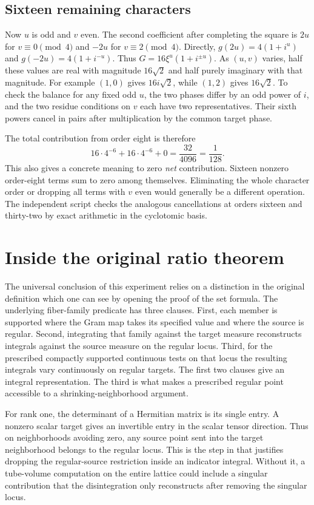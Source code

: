 \documentclass[12pt,letterpaper]{article}
\newcommand{\code}[1]{\texttt{\detokenize{#1}}}
\begin{document}
\subsection{Sixteen remaining characters}
Now $u$ is odd and $v$ even. The second coefficient after completing the square is $2u$ for $v\equiv0\pmod4$ and $-2u$ for $v\equiv2\pmod4$. Directly, $g(2u)=4(1+i^u)$ and $g(-2u)=4(1+i^{-u})$. Thus $G=16\xi^u(1+i^{\pm u})$. As $(u,v)$ varies, half these values are real with magnitude $16\sqrt2$ and half purely imaginary with that magnitude. For example $(1,0)$ gives $16i\sqrt2$, while $(1,2)$ gives $16\sqrt2$. To check the balance for any fixed odd $u$, the two phases differ by an odd power of $i$, and the two residue conditions on $v$ each have two representatives. Their sixth powers cancel in pairs after multiplication by the common target phase.
\par
The total contribution from order eight is therefore
\[
        16\cdot4^{-6}+16\cdot4^{-6}+0=\frac{32}{4096}=\frac1{128}.
\]
This also gives a concrete meaning to zero \emph{net} contribution. Sixteen nonzero order-eight terms sum to zero among themselves. Eliminating the whole character order or dropping all terms with $v$ even would generally be a different operation. The independent script checks the analogous cancellations at orders sixteen and thirty-two by exact arithmetic in the cyclotomic basis.
\section{Inside the original ratio theorem}
The universal conclusion of this experiment relies on a distinction in the original definition which one can see by opening the proof of the set formula. The underlying fiber-family predicate has three clauses. First, each member is supported where the Gram map takes its specified value and where the source is regular. Second, integrating that family against the target measure reconstructs integrals against the source measure on the regular locus. Third, for the prescribed compactly supported continuous tests on that locus the resulting integrals vary continuously on regular targets. The first two clauses give an integral representation. The third is what makes a prescribed regular point accessible to a shrinking-neighborhood argument.
\par
For rank one, the determinant of a Hermitian matrix is its single entry. A nonzero scalar target gives an invertible entry in the scalar tensor direction. Thus on neighborhoods avoiding zero, any source point sent into the target neighborhood belongs to the regular locus. This is the step in \code{mass_eq_lintegral} that justifies dropping the regular-source restriction inside an indicator integral. Without it, a tube-volume computation on the entire lattice could include a singular contribution that the disintegration only reconstructs after removing the singular locus.
\end{document}

